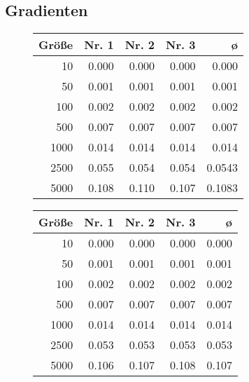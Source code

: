 \documentclass[a4paper, 10pt, twoside, onecolumn, parskip]{scrartcl}
\begin{document}
    \newpage
    \appendix
    
    \newpage
    

    \iffalse
    \subsection{Gradienten} \label{subsec:gradienten}

    \begin{figure}[H]
        \begin{minipage}{.45\textwidth}
            \begin{center}
                \begin{tabular}{|r|r|r|r|r|}
                    \hline
                    Größe & Nr. 1 & Nr. 2 & Nr. 3 & ø \\\hline
                    10 & 0.000 & 0.000 & 0.000 & 0.000 \\\hline
                    50 & 0.001 & 0.001 & 0.001 & 0.001 \\\hline
                    100 & 0.002 & 0.002 & 0.002 & 0.002 \\\hline
                    500 & 0.007 & 0.007 & 0.007 & 0.007 \\\hline
                    1000 & 0.014 & 0.014 & 0.014 & 0.014 \\\hline
                    2500 & 0.055 & 0.054 & 0.054 & 0.0543 \\\hline
                    5000 & 0.108 & 0.110 & 0.107 & 0.1083 \\\hline
                \end{tabular}
            \end{center}
        \end{minipage}\hfill%
        \begin{minipage}{.45\textwidth}
            \begin{center}
                \begin{tabular}{|r|r|r|r|r|}
                    \hline
                    Größe & Nr. 1 & Nr. 2 & Nr. 3 & ø \\\hline
                    10 & 0.000 & 0.000 & 0.000 & 0.000 \\\hline
                    50 & 0.001 & 0.001 & 0.001 & 0.001 \\\hline
                    100 & 0.002 & 0.002 & 0.002 & 0.002 \\\hline
                    500 & 0.007 & 0.007 & 0.007 & 0.007 \\\hline
                    1000 & 0.014 & 0.014 & 0.014 & 0.014 \\\hline
                    2500 & 0.053 & 0.053 & 0.053 & 0.053 \\\hline
                    5000 & 0.106 & 0.107 & 0.108 & 0.107 \\\hline
                \end{tabular}
            \end{center}
        \end{minipage}
    \end{figure}
\end{document}
